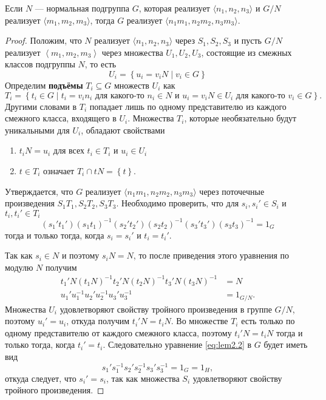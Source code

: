\begin{lemma}\label{lem:03:2.2}
  Если $N$ --- нормальная подгруппа $G$, которая реализует $\langle n_1, n_2, n_3 \rangle$ и $G/N$ реализует $\langle m_1, m_2, m_3 \rangle$, тогда $G$ реализует $\langle n_1m_1, n_2m_2, n_3m_3\rangle$.
\end{lemma}
\begin{proof}
Положим, что $N$ реализует $\langle n_1, n_2, n_3 \rangle$ через $S_1, S_2, S_3$ и пусть $G/N$ реализует $\left\langle m_1,m_2,m_3 \right\rangle$ через множества $U_1, U_2, U_3$, состоящие из смежных классов подгруппы $N$, то есть
\[
	U_i = \left\{ u_i = v_i N \mid v_i \in G \right\}
\]
Определим \textbf{подъёмы} $T_i \subseteq G$ множеств $U_i$ как
\[
	T_i = \left\{ t_i \in G \mid t_i = v_i n_i \text{ для какого-то } n_i \in N \text{ и } u_i = v_i N \in U_i \text{ для какого-то } v_i \in G  \right\}.
\]
Другими словами в $T_i$ попадает лишь по одному представителю из каждого смежного класса, входящего в $U_i$. Множества $T_i$, которые необязательно будут уникальными для $U_i$, обладают свойствами 
\begin{enumerate}
     \item $t_i N = u_i$ для всех $t_i \in T_i$ и $u_i \in U_i$
     \item $t \in T_i$ означает $T_i \cap t N = \left\{ t \right\}$.
\end{enumerate}
Утверждается, что $G$ реализует $\langle n_1m_1, n_2m_2, n_3m_3\rangle$ через поточечные произведения $S_1T_1, S_2T_2, S_3T_3$. Необходимо проверить, что для $s_i, s_i' \in S_i$ и $t_i, t_i' \in T_i$
\begin{equation}\label{eq:lem2.2}
	(s_1't_1')(s_1t_1)^{-1}(s_2't_2')(s_2t_2)^{-1}(s_3't_3')(s_3t_3)^{-1}=1_G
\end{equation}
тогда и только тогда, когда $s_i = s_i'$ и $t_i = t_i'$. 

Так как $s_i \in N$ и поэтому $s_iN = N$, то после приведения этого уравнения по модулю $N$ получим
\begin{align*}
     t_1'N(t_1N)^{-1}t_2'N(t_2N)^{-1}t_3'N(t_3N)^{-1} & = N\\
     u_1' u_1^{-1} u_2' u_2^{-1} u_3' u_3^{-1} & = 1_{G/N}.
\end{align*}
Множества $U_i$ удовлетворяют свойству тройного произведения в группе $G/N$, поэтому $u_i' = u_i$, откуда получим $t_i'N=t_iN$. Во множестве $T_i$ есть только по одному представителю от каждого смежного класса, поэтому $t_i'N=t_iN$ тогда и только тогда, когда $t_i'=t_i$. Следовательно уравнение \eqref{eq:lem2.2} в $G$ будет иметь вид
\[
	s_1' s_1^{-1} s_2' s_2^{-1} s_3' s_3^{-1}=1_G=1_H,
\]
откуда следует, что $s_i' = s_i$, так как множества $S_i$ удовлетворяют свойству тройного произведения.
\end{proof}

